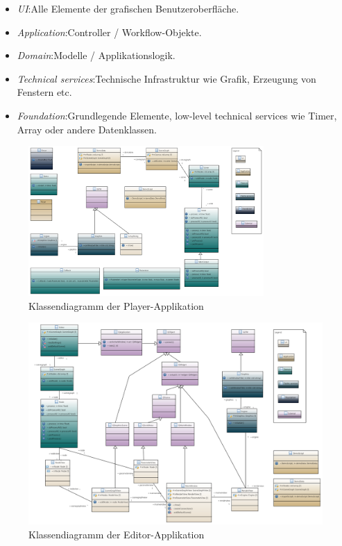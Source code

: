 \begin{itemize}
    \item[]
        \textit{UI}:\@ Alle Elemente der grafischen Benutzeroberfläche.
    \item[]
        \textit{Application}:\@ Controller / Workflow-Objekte.
    \item[]
        \textit{Domain}:\@ Modelle / Applikationslogik.
    \item[]
        \textit{Technical services}:\@ Technische Infrastruktur wie Grafik, Erzeugung von
        Fenstern etc.
    \item[]
        \textit{Foundation}:\@ Grundlegende Elemente, low-level technical services wie
        Timer, Array oder andere Datenklassen.
\end{itemize}

\begin{figure}[H]
    \centering
    \includegraphics[width=0.8\textwidth]{img/player_class_diagram.png}
    \caption{Klassendiagramm der
        Player-Applikation\protect\footnotemark}\label{fig:class-diagram:player}
\end{figure}

\begin{figure}[H]
    \centering
    \includegraphics[width=1.0\textwidth]{img/editor_class_diagram.png}
    \caption{Klassendiagramm der
        Editor-Applikation\protect\footnotemark}\label{fig:class-diagram:editor}
\end{figure}
